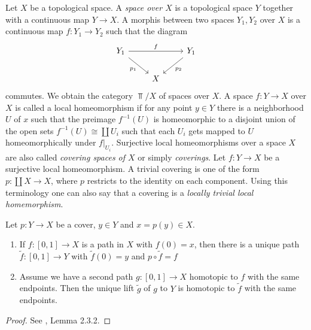 \begin{construction}
	Let $X$ be a topological space. A \textit{space over $X$ } is a topological space $Y$ together with a continuous map $Y \to X$. A morphis between two spaces $Y_1, Y_2$ over $X$ is a continuous map $f: Y_1 \to Y_2$ such that the diagram
	\[
		\begin{tikzcd}
			{Y_1} && {Y_1} \\
			& X
			\arrow["f", from=1-1, to=1-3]
			\arrow["{p_2}", from=1-3, to=2-2]
			\arrow["{p_1}"', from=1-1, to=2-2]
		\end{tikzcd}
	\]
	commutes. We obtain the category $\Top/X$ of spaces over $X$. A space $f: Y \to X$ over $X$ is called a local homeomorphism if for any point $y \in Y$ there is a neighborhood $U$ of $x$ such that the preimage $f^{-1}(U)$ is homeomorphic to a disjoint union of the open sets $f^{-1}(U) \cong \coprod U_i$ such that each $U_i$ gets mapped to $U$ homeomorphically under $f|_{U_i}$. Surjective local homeomorphisms over a space $X$ are also called \textit{covering spaces of $X$} or simply \textit{coverings}. Let $f: Y \to X$ be a surjective local homeomorphism. A trivial covering is one of the form $p: \coprod X \to X$, where $p$ restricts to the identity on each component. Using this terminology one can also say that a covering is a \textit{locally trivial local homemorphism}.
\end{construction}

\begin{lemma}
	Let $p: Y \to X$ be a cover, $y \in Y$ and $x = p(y) \in X$.
	\begin{enumerate}
		\item If $f: [0,1] \to X$ is a path in $X$ with $f(0) = x$, then there is a unique path $\tilde{f}: [0,1] \to Y$ with $\tilde{f}(0) = y$ and $p \circ \tilde{f} = f$
		\item Assume we have a second path $g \colon [0,1] \to X$ homotopic to $f$ with the same endpoints. Then the unique lift $\tilde{g}$ of $g$ to $Y$ is homotopic to $\tilde{f}$ with the same endpoints.
	\end{enumerate}
\end{lemma}

\begin{proof}
	See \cite{Szamuely}, Lemma 2.3.2.
\end{proof}


